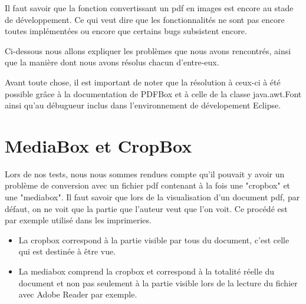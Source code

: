 		Il faut savoir que la fonction convertissant un pdf en images est encore
    au stade de développement. Ce qui veut dire que  les fonctionnalités ne sont 
    pas encore toutes implémentées ou encore que certains bugs subsistent encore.

        Ci-dessous nous allons expliquer les problèmes que nous avons rencontrés,
    ainsi que la manière dont nous avons résolus chacun d'entre-eux.

        Avant toute chose, il est important de noter que la résolution à ceux-ci
    à été possible grâce à la documentation de PDFBox et à celle de la classe 
    java.awt.Font ainsi qu'au débugueur inclus dans l'environnement de dévelopement 
    Eclipse.


	\section{MediaBox et CropBox}
        Lors de nos tests, nous nous sommes rendues compte qu'il pouvait y 
    avoir un problème de conversion avec un fichier pdf contenant à la fois une 
    "cropbox" et une "mediabox". Il faut savoir que lors de la visualisation d'un 
    document pdf, par défaut, on ne voit que la partie que l'auteur veut que l'on 
    voit. Ce procédé est par exemple utilisé dans les imprimeries. 

		\begin{itemize}
			\item La cropbox correspond  à la partie visible par tous du document, 
                  c'est celle qui est destinée à être vue.
			\item La mediabox comprend la cropbox et correspond à la totalité 
                  réelle du document et non pas seulement à la partie visible 
                  lors de la lecture du fichier avec Adobe Reader par exemple. 
		\end{itemize}

    
